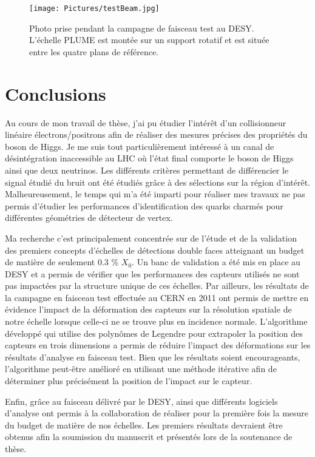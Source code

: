 \documentclass[a4papper, 10pt]{article}
\begin{document}
  \begin{figure}
    \centering
    \texttt{[image: Pictures/testBeam.jpg]}
    \caption{Photo prise pendant la campagne de faisceau test au DESY. L'échelle PLUME est montée sur un support rotatif et est située entre les quatre plans de référence.}
    \label{fig:testBeam}
  \end{figure}

  \section{Conclusions}
 
  Au cours de mon travail de thèse, j'ai pu étudier l'intérêt d'un collisionneur linéaire électrons/positrons afin de réaliser des mesures précises des propriétés du boson de Higgs.
  Je me suis tout particulièrement intéressé à un canal de désintégration inaccessible au LHC où l'état final comporte le boson de Higgs ainsi que deux neutrinos. 
  Les différents critères permettant de différencier le signal étudié du bruit ont été étudiés grâce à des sélections sur la région d'intérêt.
  Malheureusement, le temps qui m'a été imparti pour réaliser mes travaux ne pas permis d'étudier les performances d'identification des quarks charmés pour différentes géométries de détecteur de vertex.

  Ma recherche c'est principalement concentrée sur de l'étude et de la validation des premiers concepts d'échelles de détections double faces atteignant un budget de matière de seulement 0.3 \% $X_0$.
  Un banc de validation a été mis en place au DESY et a permis de vérifier que les performances des capteurs utilisés ne sont pas impactées par la structure unique de ces échelles.
  Par ailleurs, les résultats de la campagne en faisceau test effectuée au CERN en 2011 ont permis de mettre en évidence l'impact de la déformation des capteurs sur la résolution spatiale de notre échelle lorsque celle-ci ne se trouve plus en incidence normale.
  L'algorithme développé qui utilise des polynômes de Legendre pour extrapoler la position des capteurs en trois dimensions a permis de réduire l'impact des déformations sur les résultats d'analyse en faisceau test.
  Bien que les résultats soient encourageants, l'algorithme peut-être amélioré en utilisant une méthode itérative afin de déterminer plus précisément la position de l'impact sur le capteur.
  
  Enfin, grâce au faisceau délivré par le DESY, ainsi que différents logiciels d'analyse ont permis à la collaboration de réaliser pour la première fois la mesure du budget de matière de nos échelles.
  Les premiers résultats devraient être obtenus afin la soumission du manuscrit et présentés lors de la soutenance de thèse.
\end{document}
